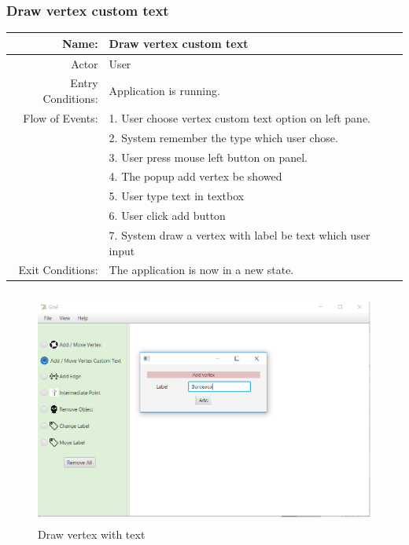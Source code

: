 \documentclass[a4paper,10pt]{article}
\begin{document}
\subsubsection{Draw vertex custom text}
	\begin{tabular}{|r|l|}
\hline
Name: & Draw vertex custom text \\
\hline
Actor & User \\
\hline
Entry Conditions: & Application is running. \\
\hline
Flow of Events: & 1. User choose vertex custom text option on left pane. \\


& 2. System remember the type which user chose.  \\
& 3. User press mouse left button on panel.  \\
& 4. The popup add vertex be showed  \\
& 5. User type text in textbox  \\
& 6. User click add button  \\
& 7. System draw a vertex with label be text which user input   \\
\hline
Exit Conditions: & The application is now in a new state. \\
\hline

\end{tabular}
	\paragraph{}
	
\begin{figure}[H]
		\centering
		\includegraphics[height = 3in]{drawVertexWithText.png}
		\caption[Optional caption]{Draw vertex with text}
		\label{fig:Repository}
	\end{figure}
\end{document}
